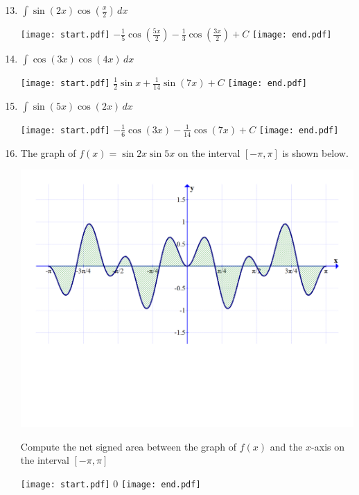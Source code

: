 \documentclass[12pt]{article}
\begin{document}

\begin{enumerate}
\setcounter{enumi}{12}

\item $\int \sin{(2x)}\cos{\left(\frac{x}{2}\right)}\,dx$ 

\texttt{[image: start.pdf]}
{{$-\frac{1}{5}\cos{\left(\frac{5x}{2}\right)}-\frac{1}{3}\cos{\left(\frac{3x}{2}\right)}+C$}}
\texttt{[image: end.pdf]}


\item $\int \cos{(3x)}\cos{(4x)}\,dx$ 

\texttt{[image: start.pdf]}
{{$\frac{1}{2}\sin{x}+\frac{1}{14}\sin{(7x)}+C$}}
\texttt{[image: end.pdf]}


\item $\int \sin{(5x)}\cos{(2x)}\,dx$ 

\texttt{[image: start.pdf]}
{{$-\frac{1}{6}\cos{(3x)}-\frac{1}{14}\cos{(7x)}+C$}}
\texttt{[image: end.pdf]}


\newpage

\item The graph of $f(x)=\sin{2x}\sin{5x}$ on the interval $[-\pi,\pi]$ is shown below.

\begin{center}
\includegraphics[scale=0.3]{graph.pdf}
\end{center}

Compute the net signed area between the graph of $f(x)$ and the $x$-axis on the interval $[-\pi,\pi]$

\texttt{[image: start.pdf]}
{{0}}
\texttt{[image: end.pdf]}


\end{enumerate}
\end{document}
